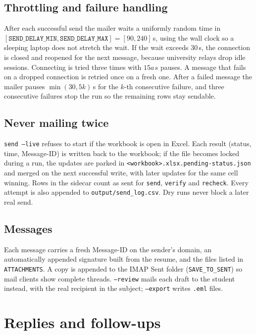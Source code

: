\documentclass[11pt,a4paper]{article}
\newcommand{\code}[1]{\texttt{#1}}
\begin{document}
\subsection{Throttling and failure handling}
After each successful send the mailer waits a uniformly random time in
$[\code{SEND\_DELAY\_MIN}, \code{SEND\_DELAY\_MAX}] = [90, 240]$\,s, using the wall clock so a
sleeping laptop does not stretch the wait. If the wait exceeds 30\,s, the connection is closed
and reopened for the next message, because university relays drop idle sessions. Connecting is
tried three times with $15a$\,s pauses. A message that fails on a dropped connection is retried
once on a fresh one. After a failed message the mailer pauses $\min(30, 5k)$\,s for the $k$-th
consecutive failure, and three consecutive failures stop the run so the remaining rows stay
sendable.

\subsection{Never mailing twice}
\code{send --live} refuses to start if the workbook is open in Excel. Each result (status,
time, Message-ID) is written back to the workbook; if the file becomes locked during a run, the
updates are parked in \code{<workbook>.xlsx.pending-status.json} and merged on the next
successful write, with later updates for the same cell winning. Rows in the sidecar count as sent
for \code{send}, \code{verify} and \code{recheck}. Every attempt is also appended to
\code{output/send\_log.csv}. Dry runs never block a later real send.

\subsection{Messages}
Each message carries a fresh Message-ID on the sender's domain, an automatically appended
signature built from the resume, and the files listed in \code{ATTACHMENTS}. A copy is appended
to the IMAP Sent folder (\code{SAVE\_TO\_SENT}) so mail clients show complete threads.
\code{--review} mails each draft to the student instead, with the real recipient in the subject;
\code{--export} writes \code{.eml} files.

\section{Replies and follow-ups}
\end{document}

